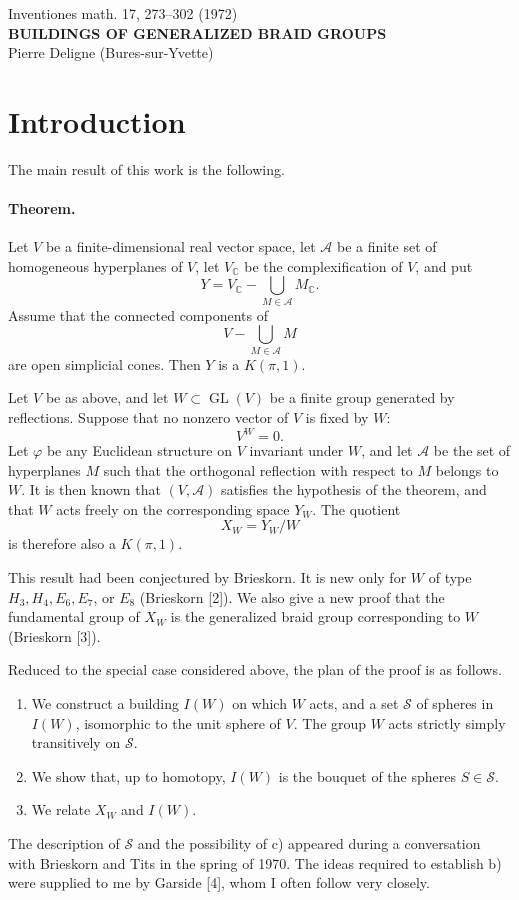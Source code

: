 \documentclass[10pt]{article}
\newcommand{\C}{\mathbb C}
\newcommand{\GL}{\operatorname{GL}}
\newcommand{\mcA}{\mathcal A}
\newcommand{\mcS}{\mathcal S}
\begin{document}
\begin{center}
{\large Inventiones math. 17, 273--302 (1972)}\\[0.4em]
{\Large\bfseries BUILDINGS OF GENERALIZED BRAID GROUPS}\\[0.4em]
Pierre Deligne (Bures-sur-Yvette)
\end{center}

\section*{Introduction}

The main result of this work is the following.

\paragraph{Theorem.} Let $V$ be a finite-dimensional real vector space, let $\mcA$ be a finite set of homogeneous hyperplanes of $V$, let $V_\C$ be the complexification of $V$, and put
\[
Y=V_\C-\bigcup_{M\in\mcA}M_\C.
\]
Assume that the connected components of
\[
V-\bigcup_{M\in\mcA}M
\]
are open simplicial cones. Then $Y$ is a $K(\pi,1)$.

Let $V$ be as above, and let $W\subset \GL(V)$ be a finite group generated by reflections. Suppose that no nonzero vector of $V$ is fixed by $W$:
\[
V^W=0.
\]
Let $\varphi$ be any Euclidean structure on $V$ invariant under $W$, and let $\mcA$ be the set of hyperplanes $M$ such that the orthogonal reflection with respect to $M$ belongs to $W$. It is then known that $(V,\mcA)$ satisfies the hypothesis of the theorem, and that $W$ acts freely on the corresponding space $Y_W$. The quotient
\[
X_W=Y_W/W
\]
is therefore also a $K(\pi,1)$.

This result had been conjectured by Brieskorn. It is new only for $W$ of type $H_3,H_4,E_6,E_7$, or $E_8$ (Brieskorn [2]). We also give a new proof that the fundamental group of $X_W$ is the generalized braid group corresponding to $W$ (Brieskorn [3]).

Reduced to the special case considered above, the plan of the proof is as follows.
\begin{enumerate}[label=\alph*)]
\item We construct a building $I(W)$ on which $W$ acts, and a set $\mcS$ of spheres in $I(W)$, isomorphic to the unit sphere of $V$. The group $W$ acts strictly simply transitively on $\mcS$.
\item We show that, up to homotopy, $I(W)$ is the bouquet of the spheres $S\in\mcS$.
\item We relate $X_W$ and $I(W)$.
\end{enumerate}
The description of $\mcS$ and the possibility of c) appeared during a conversation with Brieskorn and Tits in the spring of 1970. The ideas required to establish b) were supplied to me by Garside [4], whom I often follow very closely.
\end{document}

